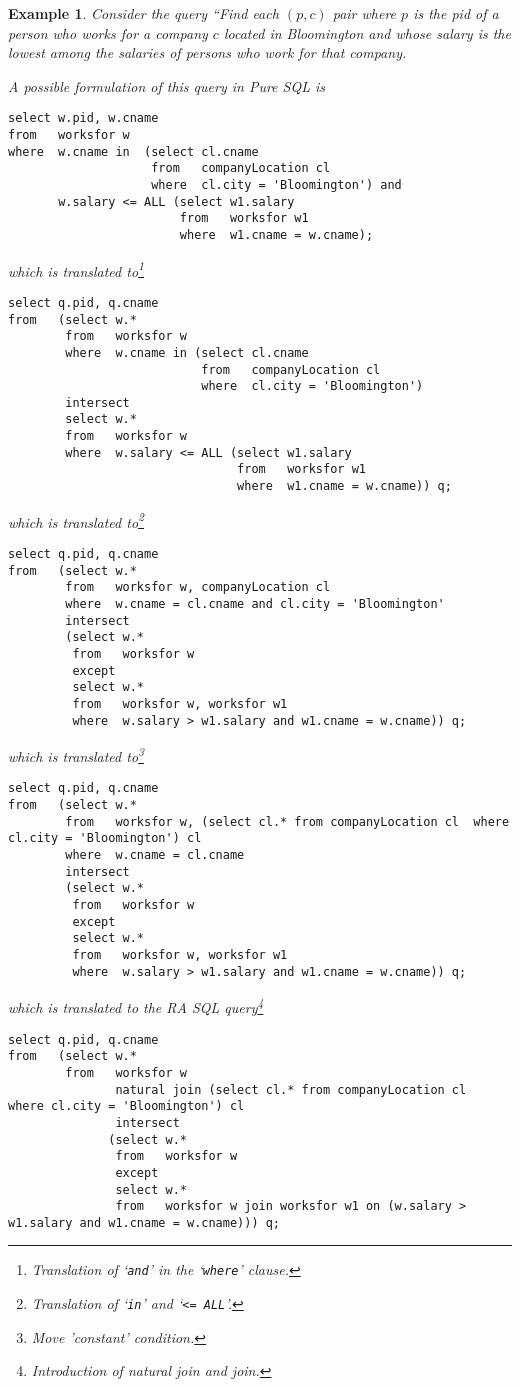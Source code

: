 \documentclass[11pt]{article}
\newtheorem{example}{Example}
\begin{document}
\begin{example}\label{TranslationExample}
Consider the query ``\emph{Find each $(p,c)$ pair where $p$ is the pid of a person who works for a company $c$ 
located in Bloomington and 
whose salary is the lowest among the salaries of persons who work for that company.}
\medskip

A possible formulation of this query in Pure SQL is
{\tiny
\begin{verbatim}
select w.pid, w.cname
from   worksfor w
where  w.cname in  (select cl.cname 
                    from   companyLocation cl 
                    where  cl.city = 'Bloomington') and
       w.salary <= ALL (select w1.salary
                        from   worksfor w1
                        where  w1.cname = w.cname);
\end{verbatim}        }   
which is translated to\footnote{Translation of `{\tt and}' in the `{\tt where}' clause.}
{\tiny
\begin{verbatim}
select q.pid, q.cname
from   (select w.*
        from   worksfor w
        where  w.cname in (select cl.cname
                           from   companyLocation cl
                           where  cl.city = 'Bloomington')
        intersect
        select w.*
        from   worksfor w
        where  w.salary <= ALL (select w1.salary
                                from   worksfor w1
                                where  w1.cname = w.cname)) q;
\end{verbatim}
}   
which is translated to\footnote{Translation of  `{\tt in}' and `{\tt <= ALL}'.}
{\tiny
\begin{verbatim}
select q.pid, q.cname
from   (select w.*
        from   worksfor w, companyLocation cl
        where  w.cname = cl.cname and cl.city = 'Bloomington'
        intersect
        (select w.*
         from   worksfor w
         except
         select w.*
         from   worksfor w, worksfor w1
         where  w.salary > w1.salary and w1.cname = w.cname)) q;
\end{verbatim}
}
which is translated to\footnote{Move 'constant' condition.}
{\tiny
\begin{verbatim}
select q.pid, q.cname
from   (select w.*
        from   worksfor w, (select cl.* from companyLocation cl	 where cl.city = 'Bloomington') cl
        where  w.cname = cl.cname
        intersect
        (select w.*
         from   worksfor w
         except
         select w.*
         from   worksfor w, worksfor w1
         where  w.salary > w1.salary and w1.cname = w.cname)) q;
\end{verbatim}
}
which is translated to the RA SQL query\footnote{Introduction of natural join and join.}
{\tiny
\begin{verbatim}
select q.pid, q.cname
from   (select w.*
        from   worksfor w
               natural join (select cl.* from companyLocation cl  where cl.city = 'Bloomington') cl
               intersect
              (select w.*
               from   worksfor w
               except
               select w.*
               from   worksfor w join worksfor w1 on (w.salary > w1.salary and w1.cname = w.cname))) q;
\end{verbatim}
}


\end{example}
\end{document}
